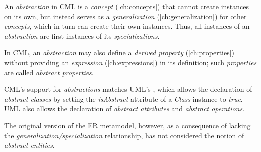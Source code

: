 An \emph{abstraction} in CML is a \emph{concept} (\ref{ch:concepts})
that cannot create instances on its own,
but instead serves as a \emph{generalization} (\ref{ch:generalization})
for other \emph{concepts},
which in turn can create their own instances.
Thus, all instances of an \emph{abstraction}
are first instances of its \emph{specializations}.

In CML, an \emph{abstraction} may also define a \emph{derived property} (\ref{ch:properties})
without providing an \emph{expression} (\ref{ch:expressions}) in its definition;
such \emph{properties} are called \emph{abstract properties}.

CML's support for \emph{abstractions} matches UML's \cite{uml},
which allows the declaration of \emph{abstract classes}
by setting the \emph{isAbstract} attribute of a \emph{Class} instance to \emph{true}.
UML also allows the declaration of \emph{abstract attributes} and \emph{abstract operations}.

The original version of the ER \cite{er} metamodel, however,
as a consequence of lacking the \emph{generalization/specialization} relationship,
has not considered the notion of \emph{abstract entities}.
